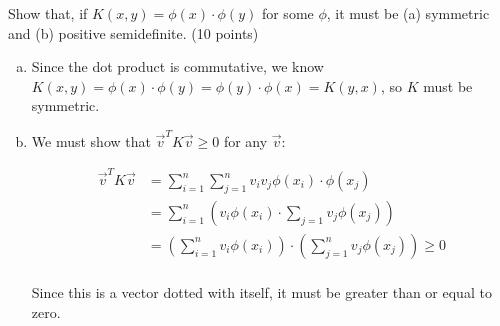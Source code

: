 \documentclass[fleqn]{homework}
\begin{document}
  \begin{problem}{3}
    \begin{question}
      Show that, if $K(x,y) = \phi(x) \cdot \phi(y)$ for some $\phi$, it must be
      (a) symmetric and (b) positive semidefinite. (10 points)
    \end{question}

    \begin{enumerate}[(a)]
    \item Since the dot product is commutative, we know
      $K(x,y) = \phi(x) \cdot \phi(y) = \phi(y) \cdot \phi(x) = K(y,x)$, so $K$
      must be symmetric.
    \item We must show that $\vec{v}^T K \vec{v} \ge 0$ for any $\vec{v}$:

      \begin{align*}
        \vec{v}^T K \vec{v} &= \sum_{i=1}^n \sum_{j=1}^n v_i v_j \phi(x_i) \cdot \phi(x_j) \\
        &= \sum_{i=1}^n \left(v_i \phi(x_i) \cdot \sum_{j=1} v_j \phi(x_j) \right) \\
        &= \left(\sum_{i=1}^n v_i \phi(x_i)\right) \cdot \left(\sum_{j=1}^n v_j \phi(x_j)\right) \ge 0\\
      \end{align*}

      Since this is a vector dotted with itself, it must be greater than or
      equal to zero.
    \end{enumerate}
  \end{problem}
\end{document}
